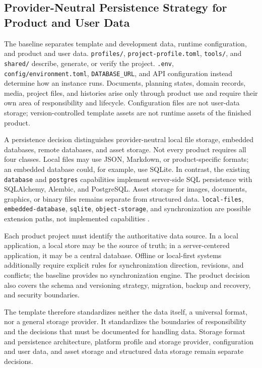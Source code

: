 \subsection{Provider-Neutral Persistence Strategy for Product and User Data}
\label{subsec:providerneutrale-persistenzstrategie}

The baseline separates template and development data, runtime configuration,
and product and user data. \texttt{profiles/},
\texttt{project-profile.toml}, \texttt{tools/}, and \texttt{shared/} describe,
generate, or verify the project. \texttt{.env},
\texttt{config/environment.toml}, \texttt{DATABASE\_URL}, and API
configuration instead determine how an instance runs. Documents, planning
states, domain records, media, project files, and histories arise only through
product use and require their own area of responsibility and lifecycle.
Configuration files are not user-data storage; version-controlled template
assets are not runtime assets of the finished product.

A persistence decision distinguishes provider-neutral local file storage,
embedded databases, remote databases, and asset storage. Not every product
requires all four classes. Local files may use JSON, Markdown, or
product-specific formats; an embedded database could, for example, use
SQLite. In contrast, the existing \texttt{database} and \texttt{postgres}
capabilities implement server-side SQL persistence with SQLAlchemy, Alembic,
and PostgreSQL. Asset storage for images, documents, graphics, or binary files
remains separate from structured data. \texttt{local-files},
\texttt{embedded-database}, \texttt{sqlite}, \texttt{object-storage}, and
synchronization are possible extension paths, not implemented capabilities
\parencite{kleiveist2026persistence}.

Each product project must identify the authoritative data source. In a local
application, a local store may be the source of truth; in a server-centered
application, it may be a central database. Offline or local-first systems
additionally require explicit rules for synchronization direction, revisions,
and conflicts; the baseline provides no synchronization engine. The product
decision also covers the schema and versioning strategy, migration, backup and
recovery, and security boundaries.

The template therefore standardizes neither the data itself, a universal
format, nor a general storage provider. It standardizes the boundaries of
responsibility and the decisions that must be documented for handling data.
Storage format and persistence architecture, platform profile and storage
provider, configuration and user data, and asset storage and structured data
storage remain separate decisions.
